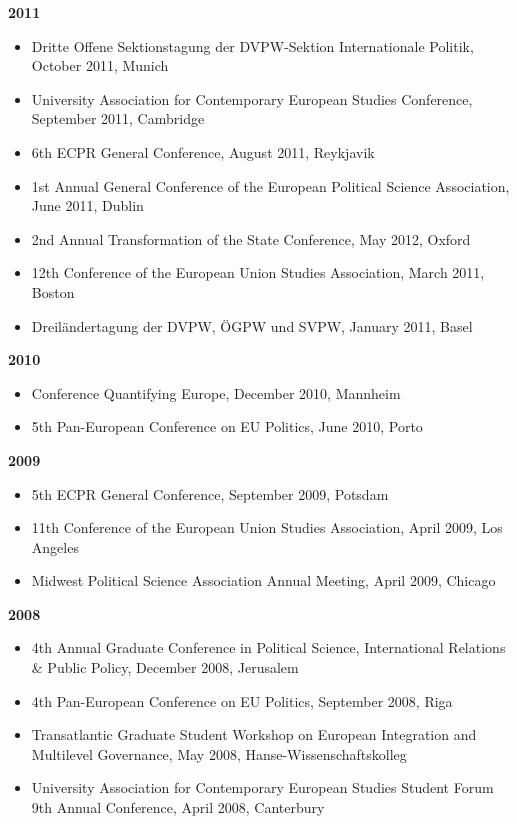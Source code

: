 \textbf{2011}
\begin{itemize}[topsep=0pt, noitemsep, leftmargin=3]
	\item Dritte Offene Sektionstagung der DVPW-Sektion Internationale Politik, October 2011, Munich
	\item University Association for Contemporary European Studies Conference, September 2011, Cambridge
	\item 6th ECPR General Conference, August 2011, Reykjavik
	\item 1st Annual General Conference of the European Political Science Association, June 2011, Dublin
	\item 2nd Annual Transformation of the State Conference, May 2012, Oxford
	\item 12th Conference of the European Union Studies Association, March 2011, Boston
	\item Dreiländertagung der DVPW, ÖGPW und SVPW, January 2011, Basel
\end{itemize}

\vspace{\baselineskip}

\textbf{2010}
\begin{itemize}[topsep=0pt, noitemsep, leftmargin=3]
	\item Conference Quantifying Europe, December 2010, Mannheim
	\item 5th Pan-European Conference on EU Politics, June 2010, Porto
\end{itemize}

\vspace{\baselineskip}

\textbf{2009}
\begin{itemize}[topsep=0pt, noitemsep, leftmargin=3]
	\item 5th ECPR General Conference, September 2009, Potsdam
	\item 11th Conference of the European Union Studies Association, April 2009, Los Angeles
	\item Midwest Political Science Association Annual Meeting, April 2009, Chicago
\end{itemize}

\vspace{\baselineskip}

\textbf{2008}
\begin{itemize}[topsep=0pt, noitemsep, leftmargin=3]
	\item 4th Annual Graduate Conference in Political Science, International Relations \& Public Policy, December 2008, Jerusalem
	\item 4th Pan-European Conference on EU Politics, September 2008, Riga
	\item Transatlantic Graduate Student Workshop on European Integration and Multilevel Governance, May 2008, Hanse-Wissenschaftskolleg
	\item University Association for Contemporary European Studies Student Forum 9th Annual Conference, April 2008, Canterbury
\end{itemize}

